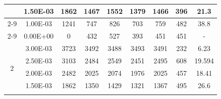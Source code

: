 \begin{table}[H]
{\begin{tabular}{|c|c|c|c|c|c|c|c|c|}
                               & 1.50E-03         & 1862      & 1467                                                       & 1552                                                      & 1379                                                      & 1466    & 396    & 21.3                                                               \\ \cline{2-9}
                               & 1.00E-03         & 1241      & 747                                                        & 826                                                       & 703                                                       & 759     & 482    & 38.8                                                               \\ \cline{2-9}
                               & 0.00E+00         & 0         & 432                                                        & 527                                                       & 393                                                       & 451     & 451    & -                                                                  \\ \hline
            \multirow{6}{*}{2} & 3.00E-03         & 3723      & 3492                                                       & 3488                                                      & 3493                                                      & 3491    & 232    & 6.23                                                               \\ \cline{2-9}
                               & 2.50E-03         & 3103      & 2484                                                       & 2549                                                      & 2451                                                      & 2495    & 608    & 19.594                                                             \\ \cline{2-9}
                               & 2.00E-03         & 2482      & 2025                                                       & 2074                                                      & 1976                                                      & 2025    & 457    & 18.41                                                              \\ \cline{2-9}
                               & 1.50E-03         & 1862      & 1350                                                       & 1429                                                      & 1321                                                      & 1367    & 495    & 26.6                                                               \\ \cline{2-9}

\end{tabular}}
\end{table}
